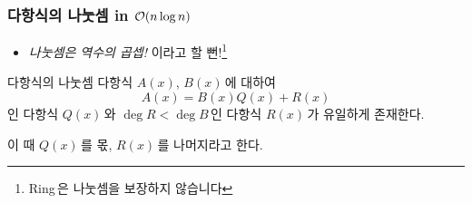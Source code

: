 \begin{frame}
    \frametitle{다항식의 나눗셈 in \(\mathcal{O}(n\log n)\)}
    \begin{itemize}
        \item<1-> \textit{나눗셈은 역수의 곱셉!} \pause \alert{이라고 할 뻔!}\footnote<2->{Ring\,은 나눗셈을 보장하지 않습니다}
    \end{itemize}

    \pause

    \begin{block}{다항식의 나눗셈}
        다항식 \(A(x)\), \(B(x)\)\,에 대하여
        \[
            A(x) = B(x)Q(x) + R(x)
        \]
        인 다항식 \(Q(x)\)\,와 \(\deg R < \deg B\)\,인 다항식 \(R(x)\)\,가 유일하게 존재한다.

        이 때 \(Q(x)\)\,를 \alert{몫}, \(R(x)\)\,를 \alert{나머지}라고 한다.
    \end{block}
\end{frame}


